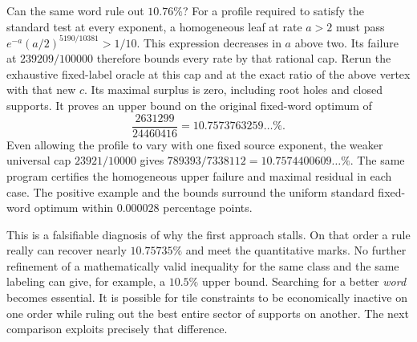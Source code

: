 Can the same word rule out \(10.76\%\)? For a profile required to satisfy the standard test at every exponent, a homogeneous leaf at rate \(a>2\) must pass \(e^{-a}(a/2)^{5190/10381}>1/10\). This expression decreases in \(a\) above two. Its failure at \(239209/100000\) therefore bounds every rate by that rational cap. Rerun the exhaustive fixed-label oracle at this cap and at the exact ratio of the above vertex with that new \(c\). Its maximal surplus is zero, including root holes and closed supports. It proves an upper bound on the original fixed-word optimum of
\[
 \frac{2631299}{24460416}=10.7573763259\ldots\%.
\]
Even allowing the profile to vary with one fixed source exponent, the weaker universal cap \(23921/10000\) gives \(789393/7338112=10.7574400609\ldots\%\). The same program certifies the homogeneous upper failure and maximal residual in each case. The positive example and the bounds surround the uniform standard fixed-word optimum within \(0.000028\) percentage points.

This is a falsifiable diagnosis of why the first approach stalls. On that order a rule really can recover nearly \(10.75735\%\) and meet the quantitative marks. No further refinement of a mathematically valid inequality for the same class and the same labeling can give, for example, a \(10.5\%\) upper bound. Searching for a better \emph{word} becomes essential. It is possible for tile constraints to be economically inactive on one order while ruling out the best entire sector of supports on another. The next comparison exploits precisely that difference.
